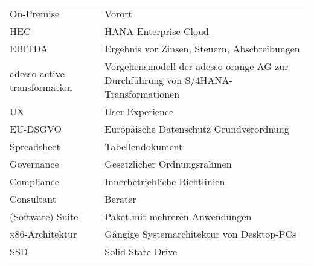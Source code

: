 \begin{xltabular}{\textwidth}{p{0.4\textwidth}p{0.6\textwidth}}
    On-Premise & Vorort\\
    HEC & HANA Enterprise Cloud\\
    EBITDA & Ergebnis vor Zinsen, Steuern, Abschreibungen\\
    adesso active transformation & Vorgehensmodell der adesso orange AG zur Durchführung von S/4HANA-Transformationen\\
    UX & User Experience\\
    EU-DSGVO & Europäische Datenschutz Grundverordnung\\
    Spreadsheet & Tabellendokument\\
    Governance & Gesetzlicher Ordnungsrahmen\\
    Compliance & Innerbetriebliche Richtlinien\\
    Consultant & Berater\\
    (Software)-Suite & Paket mit mehreren Anwendungen\\
    x86-Architektur & Gängige Systemarchitektur von Desktop-PCs\\
    SSD & Solid State Drive\\
\end{xltabular}
\newpage

\listoffigures{}
\listoftables{}

\newpage

